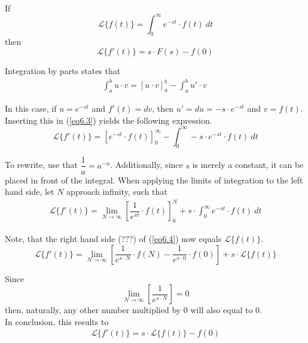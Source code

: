 \
\begin{tcolorbox}[colback=green!5!white,colframe=green!40!black,title=Theorem 6.1: Laplace transform of a first order derivative]
If
$$\mathcal{L}\{f(t)\}=\int_{0}^{\infty} e^{-st}\cdot f(t)\ dt$$
then
$$\mathcal{L}\{f'(t)\} = s\cdot F(s)-f(0)$$
\end{tcolorbox}

\begin{tcolorbox}[colback=gray!5!white,colframe=gray!!black,title=Proof 6.1]
Integration by parts states that 
\begin{align}
\int_{a}^{b}{u\cdot v}=\left[u\cdot v\right]_{a}^{b}-\int_{a}^{b}u'\cdot v\
\label{eq6.3}
\end{align}

In this case, if $u=e^{-st}$ and $f'(t)=dv$, then $u'=du=-s\cdot e^{-st}$ and $v=f(t)$.
Inserting this in (\ref{eq6.3}) yields the following expression.
$$\mathcal{L}\{f'(t)\}=\left[e^{-st}\cdot f(t)\right]_{0}^{\infty}-\int_{0}^{\infty} -s\cdot e^{-st}\cdot f(t)\ dt$$

To rewrite, use that $\dfrac{1}{a}=a^{-n}$. Additionally, since $s$ is merely a constant, it can be placed in front of the integral. When applying the limits of integration to the left hand side, let $N$ approach infinity, such that
\begin{align}
\mathcal{L}\{f'(t)\}=\lim_{N \to \infty}\left[\dfrac{1}{e^{st}}\cdot f(t)\right]_{0}^{N}+s\cdot \int_{0}^{\infty}e^{-st}\cdot f(t)\ dt
\label{eq6.4}
\end{align}

Note, that the right hand side (???) of (\ref{eq6.4}) now equals $\mathcal{L}\{f(t)\}$. 
$$\mathcal{L}\{f'(t)\} = \lim_{N \to \infty}\left[\dfrac{1}{e^{s\cdot N}}\cdot f(N)-\dfrac{1}{e^{s\cdot 0}}\cdot f(0)\right]+s\cdot \mathcal{L}\{f(t)\}$$

Since $$\lim_{N \to \infty}\left[\dfrac{1}{e^{s\cdot N}}\right]=0$$ then, naturally, any other number multiplied by 0 will also equal to 0.\\
In conclusion, this results to
\begin{align*}
\mathcal{L}\{f'(t)\} = s\cdot \mathcal{L}\{f(t)\}-f(0)
\end{align*}
\end{tcolorbox}